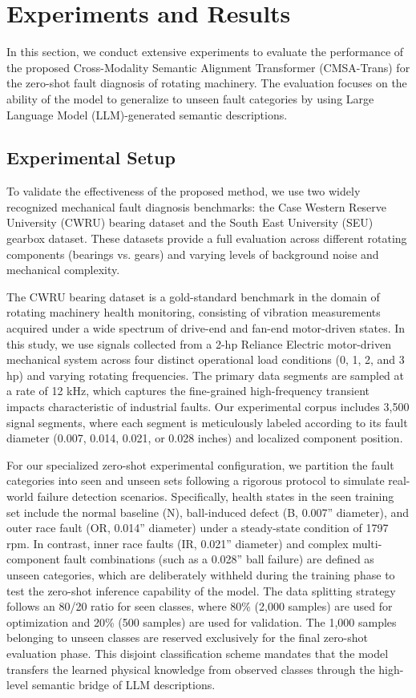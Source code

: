 \section{Experiments and Results}
In this section, we conduct extensive experiments to evaluate the performance of the proposed Cross-Modality Semantic Alignment Transformer (CMSA-Trans) for the zero-shot fault diagnosis of rotating machinery. The evaluation focuses on the ability of the model to generalize to unseen fault categories by using Large Language Model (LLM)-generated semantic descriptions.

\subsection{Experimental Setup}
To validate the effectiveness of the proposed method, we use two widely recognized mechanical fault diagnosis benchmarks: the Case Western Reserve University (CWRU) bearing dataset and the South East University (SEU) gearbox dataset. These datasets provide a full evaluation across different rotating components (bearings vs. gears) and varying levels of background noise and mechanical complexity.

The CWRU bearing dataset is a gold-standard benchmark in the domain of rotating machinery health monitoring, consisting of vibration measurements acquired under a wide spectrum of drive-end and fan-end motor-driven states. In this study, we use signals collected from a 2-hp Reliance Electric motor-driven mechanical system across four distinct operational load conditions (0, 1, 2, and 3 hp) and varying rotating frequencies. The primary data segments are sampled at a rate of 12 kHz, which captures the fine-grained high-frequency transient impacts characteristic of industrial faults. Our experimental corpus includes 3,500 signal segments, where each segment is meticulously labeled according to its fault diameter (0.007, 0.014, 0.021, or 0.028 inches) and localized component position.

For our specialized zero-shot experimental configuration, we partition the fault categories into seen and unseen sets following a rigorous protocol to simulate real-world failure detection scenarios. Specifically, health states in the seen training set include the normal baseline (N), ball-induced defect (B, 0.007'' diameter), and outer race fault (OR, 0.014'' diameter) under a steady-state condition of 1797 rpm. In contrast, inner race faults (IR, 0.021'' diameter) and complex multi-component fault combinations (such as a 0.028'' ball failure) are defined as unseen categories, which are deliberately withheld during the training phase to test the zero-shot inference capability of the model. The data splitting strategy follows an 80/20 ratio for seen classes, where 80\% (2,000 samples) are used for optimization and 20\% (500 samples) are used for validation. The 1,000 samples belonging to unseen classes are reserved exclusively for the final zero-shot evaluation phase. This disjoint classification scheme mandates that the model transfers the learned physical knowledge from observed classes through the high-level semantic bridge of LLM descriptions.

